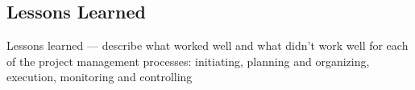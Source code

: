 \subsection{Lessons Learned}

Lessons learned — describe what worked well and what didn't work well for each of the project management processes: initiating, planning and organizing, execution, monitoring and controlling
